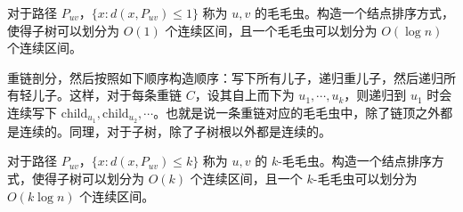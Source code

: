 \begin{example}[毛毛虫剖分]
    对于路径 $P_{uv}$，$\{x:d(x,P_{uv})\le 1\}$ 称为 $u,v$ 的毛毛虫。构造一个结点排序方式，使得子树可以划分为 $O(1)$ 个连续区间，且一个毛毛虫可以划分为 $O(\log n)$ 个连续区间。
\end{example}
\begin{solution}
    重链剖分，然后按照如下顺序构造顺序：写下所有儿子，递归重儿子，然后递归所有轻儿子。这样，对于每条重链 $C$，设其自上而下为 $u_1,\cdots,u_k$，则递归到 $u_1$ 时会连续写下 $\mathrm{child}_{u_1},\mathrm{child}_{u_2},\cdots$。也就是说一条重链对应的毛毛虫中，除了链顶之外都是连续的。同理，对于子树，除了子树根以外都是连续的。
\end{solution}
\begin{exercise}[$k$-毛毛虫剖分]
    对于路径 $P_{uv}$，$\{x:d(x,P_{uv})\le k\}$ 称为 $u,v$ 的 $k$-毛毛虫。构造一个结点排序方式，使得子树可以划分为 $O(k)$ 个连续区间，且一个 $k$-毛毛虫可以划分为 $O(k\log n)$ 个连续区间。
\end{exercise}
